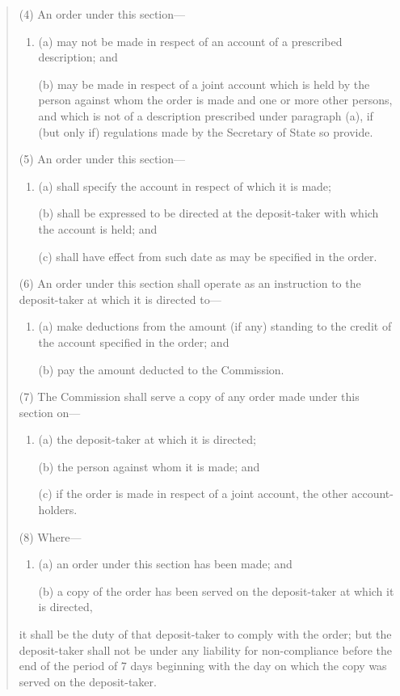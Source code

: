 \documentclass[a4paper]{article}
\begin{document}
\begin{quotation}
(4) An order under this section---
\begin{enumerate}\item[]
(a) may not be made in respect of an account of a prescribed description; and

(b) may be made in respect of a joint account which is held by the person against whom the order is made and one or more other persons, and which is not of a description prescribed under paragraph (a), if (but only if) regulations made by the Secretary of State so provide.
\end{enumerate}

(5) An order under this section---
\begin{enumerate}\item[]
(a) shall specify the account in respect of which it is made;

(b) shall be expressed to be directed at the deposit-taker with which the account is held; and

(c) shall have effect from such date as may be specified in the order.
\end{enumerate}

(6) An order under this section shall operate as an instruction to the deposit-taker at which it is directed to---
\begin{enumerate}\item[]
(a) make deductions from the amount (if any) standing to the credit of the account specified in the order; and

(b) pay the amount deducted to the Commission.
\end{enumerate}

(7) The Commission shall serve a copy of any order made under this section on---
\begin{enumerate}\item[]
(a) the deposit-taker at which it is directed;

(b) the person against whom it is made; and

(c) if the order is made in respect of a joint account, the other account-holders.
\end{enumerate}

(8)
Where---
\begin{enumerate}\item[]
(a)
an order under this section has been made; and

(b)
a copy of the order has been served on the deposit-taker at which it is directed, 
\end{enumerate}
it shall be the duty of that deposit-taker to comply with the order; but the deposit-taker shall not be under any liability for non-compliance before the end of the period of 7 days beginning with the day on which the copy was served on the deposit-taker.


\end{quotation}
\end{document}
